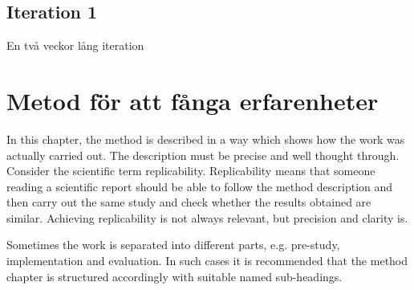 \subsection{Iteration 1}
En två veckor lång iteration 

\section{Metod för att fånga erfarenheter}

In this chapter, the method is described in a way which shows how the
work was actually carried out. The description must be precise and
well thought through. Consider the scientific term
replicability. Replicability means that someone reading a scientific
report should be able to follow the method description and then carry
out the same study and check whether the results obtained are
similar. Achieving replicability is not always relevant, but precision
and clarity is.

Sometimes the work is separated into different parts, e.g.  pre-study,
implementation and evaluation. In such cases it is recommended that
the method chapter is structured accordingly with suitable named
sub-headings.


